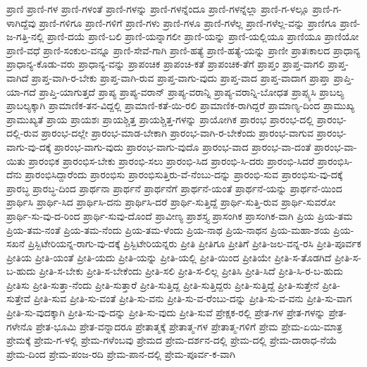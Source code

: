 ಪ್ರಾಣಿ
ಪ್ರಾಣಿ-ಗಳ
ಪ್ರಾಣಿ-ಗಳಂತೆ
ಪ್ರಾಣಿ-ಗಳನ್ನು
ಪ್ರಾಣಿ-ಗಳನ್ನೆಂದೂ
ಪ್ರಾಣಿ-ಗಳನ್ನೆಲ್ಲಾ
ಪ್ರಾಣಿ-ಗ-ಳಲ್ಲೂ
ಪ್ರಾಣಿ-ಗ-ಳಾಗಿದ್ದೆವು
ಪ್ರಾಣಿ-ಗಳಿಗೂ
ಪ್ರಾಣಿ-ಗಳಿಗೆ
ಪ್ರಾಣಿ-ಗಳು
ಪ್ರಾಣಿ-ಗಳೂ
ಪ್ರಾಣಿ-ಗಳೆಲ್ಲ
ಪ್ರಾಣಿ-ಗಳೆಲ್ಲ-ವನ್ನು
ಪ್ರಾಣಿಗೂ
ಪ್ರಾಣಿ-ಜ-ಗತ್ತಿ-ನಲ್ಲಿ
ಪ್ರಾಣಿ-ದಯೆ
ಪ್ರಾಣಿ-ಬಲಿ
ಪ್ರಾಣಿ-ಯನ್ನಾಗಲೀ
ಪ್ರಾಣಿ-ಯನ್ನು
ಪ್ರಾಣಿ-ಯಲ್ಲಿಯೂ
ಪ್ರಾಣಿಯೂ
ಪ್ರಾಣಿಯೋ
ಪ್ರಾಣಿ-ವಧೆ
ಪ್ರಾಣಿ-ಸಂಕುಲ-ವನ್ನೂ
ಪ್ರಾಣಿ-ಸೇವೆ-ಗಾಗಿ
ಪ್ರಾಣಿ-ಹತ್ಯೆ
ಪ್ರಾಣಿ-ಹತ್ಯೆ-ಯನ್ನು
ಪ್ರಾಣೀ
ಪ್ರಾತಃಕಾಲದ
ಪ್ರಾಧಾನ್ಯ
ಪ್ರಾಧಾನ್ಯ-ಕೊಡು-ವರು
ಪ್ರಾಧಾನ್ಯ-ವನ್ನು
ಪ್ರಾಪಂಚಿಕ
ಪ್ರಾಪಂಚಿ-ಕತೆ
ಪ್ರಾಪಂಚಿಕ-ತೆಗೆ
ಪ್ರಾಪ್ತಂ
ಪ್ರಾಪ್ತ-ವಾಗಲಿ
ಪ್ರಾಪ್ತ-ವಾಗಿದೆ
ಪ್ರಾಪ್ತ-ವಾಗಿ-ರ-ಬೇಕು
ಪ್ರಾಪ್ತ-ವಾಗಿ-ರುವ
ಪ್ರಾಪ್ತ-ವಾಗು-ವುದು
ಪ್ರಾಪ್ತ-ವಾದ
ಪ್ರಾಪ್ತ-ವಾದಾಗ
ಪ್ರಾಪ್ತಾ
ಪ್ರಾಪ್ತಿ-ಯಾ-ಗದೆ
ಪ್ರಾಪ್ತಿ-ಯಾಗುತ್ತದೆ
ಪ್ರಾಪ್ಯ
ಪ್ರಾಪ್ಯ-ವರಾನ್
ಪ್ರಾಪ್ಯ-ವರಾನ್ನಿ
ಪ್ರಾಪ್ಯ-ವರಾನ್ನಿ-ಬೋಧತ
ಪ್ರಾಪ್ಸ್ಯಸಿ
ಪ್ರಾಬಲ್ಯ
ಪ್ರಾಬಲ್ಯಕ್ಕಾಗಿ
ಪ್ರಾಮಾಣಿಕ-ತನ-ವಿದ್ದಲ್ಲಿ
ಪ್ರಾಮಾಣಿ-ಕತೆ-ಯಿ-ರಲಿ
ಪ್ರಾಮಾಣಿಕ-ರಾಗಿದ್ದರೆ
ಪ್ರಾಮಾಣ್ಯ-ದಿಂದ
ಪ್ರಾಮುಖ್ಯ
ಪ್ರಾಮುಖ್ಯತೆ
ಪ್ರಾಯ
ಪ್ರಾಯಶಃ
ಪ್ರಾಯಶ್ಚಿತ್ತ
ಪ್ರಾಯಶ್ಚಿತ್ತ-ಗಳನ್ನು
ಪ್ರಾಯೋಗಿಕ
ಪ್ರಾರಂಭ
ಪ್ರಾರಂಭ-ದಲ್ಲಿ
ಪ್ರಾರಂಭ-ದಲ್ಲಿ-ರುವ
ಪ್ರಾರಂಭ-ದಲ್ಲೇ
ಪ್ರಾರಂಭ-ಮಾಡ-ಬೇಕಾಗಿ
ಪ್ರಾರಂಭ-ವಾಗಿ-ರ-ಬೇಕೆಂದು
ಪ್ರಾರಂಭ-ವಾಗುವ
ಪ್ರಾರಂಭ-ವಾಗು-ವು-ದಕ್ಕೆ
ಪ್ರಾರಂಭ-ವಾಗು-ವುದು
ಪ್ರಾರಂಭ-ವಾಗು-ವುದೊ
ಪ್ರಾರಂಭ-ವಾದ
ಪ್ರಾರಂಭ-ವಾ-ದಂತೆ
ಪ್ರಾರಂಭ-ವಾ-ಯಿತು
ಪ್ರಾರಂಭಿಕ
ಪ್ರಾರಂಭಿಸ-ಬೇಕು
ಪ್ರಾರಂಭಿ-ಸಲು
ಪ್ರಾರಂಭಿ-ಸಿದ
ಪ್ರಾರಂಭಿ-ಸಿ-ದರು
ಪ್ರಾರಂಭಿ-ಸಿದರೆ
ಪ್ರಾರಂಭಿಸಿ-ದೆನು
ಪ್ರಾರಂಭಿಸಿದ್ದಾರೆಂದು
ಪ್ರಾರಂಭಿಸು
ಪ್ರಾರಂಭಿಸುತ್ತಿರು-ವೆ-ನೆಂಬು-ದನ್ನು
ಪ್ರಾರಂಭಿ-ಸುವ
ಪ್ರಾರಂಭಿಸು-ವು-ದಕ್ಕೆ
ಪ್ರಾರಬ್ಧ
ಪ್ರಾರಬ್ಧ-ದಿಂದ
ಪ್ರಾರ್ಥನಾ
ಪ್ರಾರ್ಥನೆ
ಪ್ರಾರ್ಥನೆಗೆ
ಪ್ರಾರ್ಥನೆ-ಯಂತೆ
ಪ್ರಾರ್ಥನೆ-ಯನ್ನು
ಪ್ರಾರ್ಥನೆ-ಯಿಂದ
ಪ್ರಾರ್ಥಿಸಿ
ಪ್ರಾರ್ಥಿ-ಸಿದ
ಪ್ರಾರ್ಥಿಸಿ-ದನು
ಪ್ರಾರ್ಥಿಸಿ-ದರೆ
ಪ್ರಾರ್ಥಿ-ಸುತ್ತಿದ್ದೆ
ಪ್ರಾರ್ಥಿ-ಸುತ್ತಿ-ರುವ
ಪ್ರಾರ್ಥಿ-ಸುವರೋ
ಪ್ರಾರ್ಥಿ-ಸು-ವು-ದ-ರಿಂದ
ಪ್ರಾರ್ಥಿ-ಸುವು-ದೊಂದೆ
ಪ್ರಾವೀಣ್ಯ
ಪ್ರಾಶಸ್ತ್ಯ
ಪ್ರಾಸಂಗಿಕ
ಪ್ರಾಸಂಗಿಕ-ವಾಗಿ
ಪ್ರಿಯ
ಪ್ರಿಯ-ತಮ
ಪ್ರಿಯ-ತಮ-ನಂತೆ
ಪ್ರಿಯ-ತಮ-ನೆಂದು
ಪ್ರಿಯ-ತಮ-ಳೆಂದು
ಪ್ರಿಯ-ನಾಥ
ಪ್ರಿಯ-ನಾಥನ
ಪ್ರಿಯ-ಮಹಾ-ಶಯ
ಪ್ರಿಯ-ಸಖನೆ
ಪ್ರಿಸ್ಬಿಟೇರಿಯನ್ನ-ರಾಗು-ವು-ದಕ್ಕೆ
ಪ್ರಿಸ್ಬಿಟೇರಿಯನ್ನರು
ಪ್ರೀತಿ
ಪ್ರೀತಿಗೂ
ಪ್ರೀತಿಗೆ
ಪ್ರೀತಿ-ಜಲ-ವನ್ನ-ರಸಿ
ಪ್ರೀತಿ-ಪೂರ್ವಕ
ಪ್ರೀತಿಯ
ಪ್ರೀತಿ-ಯಂತೆ
ಪ್ರೀತಿ-ಯದು
ಪ್ರೀತಿ-ಯನ್ನು
ಪ್ರೀತಿ-ಯಲ್ಲಿ
ಪ್ರೀತಿ-ಯಿಂದ
ಪ್ರೀತಿಯೇ
ಪ್ರೀತಿ-ಸ-ತೊಡಗಿದೆ
ಪ್ರೀತಿ-ಸ-ಬ-ಹುದು
ಪ್ರೀತಿ-ಸ-ಬೇಕು
ಪ್ರೀತಿ-ಸ-ಬೇಕೆಂದು
ಪ್ರೀತಿ-ಸಲಿ
ಪ್ರೀತಿ-ಸ-ಲಿಲ್ಲ
ಪ್ರೀತಿಸಿ
ಪ್ರೀತಿ-ಸಿದೆ
ಪ್ರೀತಿ-ಸಿ-ರ-ಬ-ಹುದು
ಪ್ರೀತಿಸು
ಪ್ರೀತಿ-ಸುತ್ತಾ-ನೆಂದು
ಪ್ರೀತಿ-ಸುತ್ತಾರೆ
ಪ್ರೀತಿ-ಸುತ್ತಿದ್ದ
ಪ್ರೀತಿ-ಸುತ್ತಿದ್ದರು
ಪ್ರೀತಿ-ಸುತ್ತಿದ್ದೆ
ಪ್ರೀತಿ-ಸುತ್ತೇನೆ
ಪ್ರೀತಿ-ಸುತ್ತೇವೆ
ಪ್ರೀತಿ-ಸುವ
ಪ್ರೀತಿ-ಸು-ವಂತೆ
ಪ್ರೀತಿ-ಸು-ವನು
ಪ್ರೀತಿ-ಸು-ವ-ರೆಂಬು-ದನ್ನು
ಪ್ರೀತಿ-ಸು-ವ-ವನು
ಪ್ರೀತಿ-ಸು-ವಾಗ
ಪ್ರೀತಿ-ಸು-ವುದಕ್ಕಾಗಿ
ಪ್ರೀತಿ-ಸು-ವು-ದನ್ನು
ಪ್ರೀತಿ-ಸು-ವುದು
ಪ್ರೀತಿ-ಸುವೆ
ಪ್ರೇಕ್ಷಕ-ರಲ್ಲಿ
ಪ್ರೇತ-ಗಳ
ಪ್ರೇತ-ಗಳನ್ನು
ಪ್ರೇತ-ಗಳೇನೊ
ಪ್ರೇತ-ಭೂಮಿ
ಪ್ರೇತ-ವನ್ನಾದರೂ
ಪ್ರೇತಾತ್ಮಕ್ಕೆ
ಪ್ರೇತಾತ್ಮ-ಗಳ
ಪ್ರೇತಾತ್ಮ-ಗಳಿಗೆ
ಪ್ರೇಮ
ಪ್ರೇಮ-ಏಯಿ-ಮಾತ್ರ
ಪ್ರೇಮಕ್ಕೆ
ಪ್ರೇಮ-ಗ-ಳಲ್ಲಿ
ಪ್ರೇಮ-ಗಳೆಂಬವು
ಪ್ರೇಮದ
ಪ್ರೇಮ-ದರ್ಶನ-ದಲ್ಲಿ
ಪ್ರೇಮ-ದಲ್ಲಿ
ಪ್ರೇಮ-ದಾರಾಧ-ನೆಯೆ
ಪ್ರೇಮ-ದಿಂದ
ಪ್ರೇಮ-ಪಂಜ-ರದಿ
ಪ್ರೇಮ-ಪಾನ-ದಲ್ಲಿ
ಪ್ರೇಮ-ಪೂರ್ವ-ಕ-ವಾಗಿ
